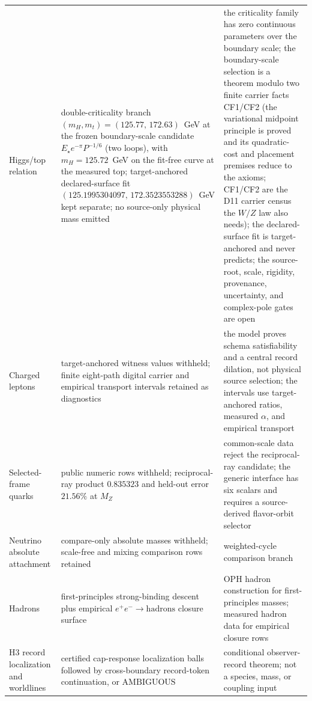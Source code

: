 \documentclass[11pt]{article}
\begin{document}
\begin{table}[h]
\begin{tabular}{@{}>{\raggedright\arraybackslash}p{}>{\raggedright\arraybackslash}p{}>{\raggedright\arraybackslash}p{}@{}}
Higgs/top relation & double-criticality branch \((m_H,m_t)=(125.77,\,172.63)\)~GeV at the frozen boundary-scale candidate \(E_\star e^{-\pi}P^{-1/6}\) (two loops), with \(m_H=125.72\)~GeV on the fit-free curve at the measured top; target-anchored declared-surface fit \((125.1995304097,\,172.3523553288)\)~GeV kept separate; no source-only physical mass emitted & the criticality family has zero continuous parameters over the boundary scale; the boundary-scale selection is a theorem modulo two finite carrier facts CF1/CF2 (the variational midpoint principle is proved and its quadratic-cost and placement premises reduce to the axioms; CF1/CF2 are the D11 carrier census the \(W/Z\) law also needs); the declared-surface fit is target-anchored and never predicts; the source-root, scale, rigidity, provenance, uncertainty, and complex-pole gates are open \\
Charged leptons & target-anchored witness values withheld; finite eight-path digital carrier and empirical transport intervals retained as diagnostics & the model proves schema satisfiability and a central record dilation, not physical source selection; the intervals use target-anchored ratios, measured \(\alpha\), and empirical transport \\
Selected-frame quarks & public numeric rows withheld; reciprocal-ray product \(0.835323\) and held-out error \(21.56\%\) at \(M_Z\) & common-scale data reject the reciprocal-ray candidate; the generic interface has six scalars and requires a source-derived flavor-orbit selector \\
Neutrino absolute attachment & compare-only absolute masses withheld; scale-free and mixing comparison rows retained & weighted-cycle comparison branch \\
Hadrons & first-principles strong-binding descent plus empirical \(e^+e^-\to\mathrm{hadrons}\) closure surface & OPH hadron construction for first-principles masses; measured hadron data for empirical closure rows \\
H3 record localization and worldlines & certified cap-response localization balls followed by cross-boundary record-token continuation, or \(\mathrm{AMBIGUOUS}\) & conditional observer-record theorem; not a species, mass, or coupling input \\
\bottomrule
\end{tabular}
\end{table}
\end{document}

